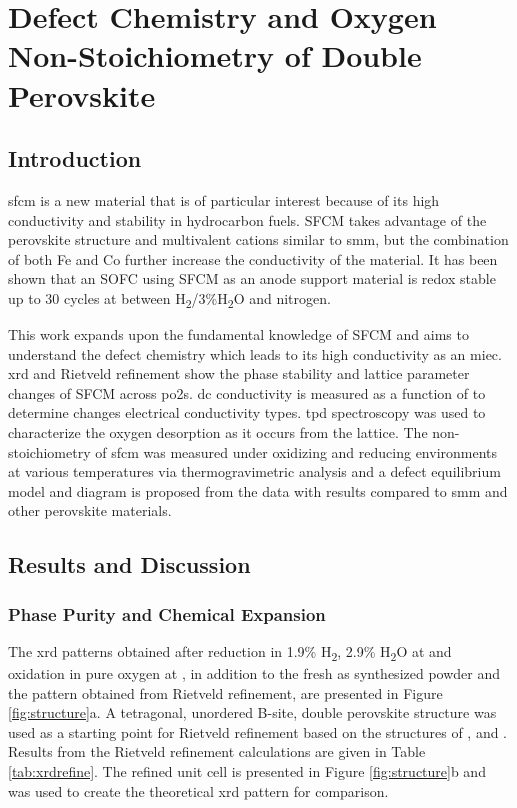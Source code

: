 
\chapter[Defect Chemistry and Oxygen Non-Stoichiometry of \ce{SrFe_{0.2}Co_{0.4}Mo_{0.4}O_{3-\delta}}]{Defect Chemistry and Oxygen Non-Stoichiometry of Double Perovskite }

\section{Introduction}
    \gls{sfcm} is a new material that is of particular interest because of its high conductivity and stability in hydrocarbon fuels.\cite{Pan}
    SFCM takes advantage of the perovskite structure and multivalent cations similar to \gls{smm}, but the combination of both Fe and Co further increase the conductivity of the material.
    It has been shown that an SOFC using SFCM as an anode support material is redox stable up to 30 cycles at  between H\textsubscript{2}/3\%H\textsubscript{2}O and nitrogen.\cite{Hussaina,Hussain}

    This work expands upon the fundamental knowledge of SFCM and aims to understand the defect chemistry which leads to its high conductivity as an \gls{miec}.
    \Gls{xrd} and Rietveld refinement show the phase stability and lattice parameter changes of SFCM across \glspl{po2}.
    \Gls{dc} conductivity is measured as a function of  to determine changes electrical conductivity types.
    \Gls{tpd} spectroscopy was used to characterize the oxygen desorption as it occurs from the lattice.
    The non-stoichiometry of \gls{sfcm} was measured under oxidizing and reducing environments at various temperatures via thermogravimetric analysis and a defect equilibrium model and diagram is proposed from the data with results compared to \gls{smm} and other perovskite materials.

\section{Results and Discussion}
    \subsection{Phase Purity and Chemical Expansion}
    The \gls{xrd} patterns obtained after reduction in 1.9\% H\textsubscript{2}, 2.9\% H\textsubscript{2}O at  and oxidation in pure oxygen at , in addition to the fresh as synthesized powder and the pattern obtained from Rietveld refinement, are presented in Figure \ref{fig:structure}a.
    A tetragonal, unordered B-site, double perovskite structure was used as a starting point for Rietveld refinement based on the structures of ,  and .\cite{Huang2009,Ritter2004}
    Results from the Rietveld refinement calculations are given in Table \ref{tab:xrdrefine}.
    The refined unit cell is presented in Figure \ref{fig:structure}b and was used to create the theoretical \gls{xrd} pattern for comparison.

